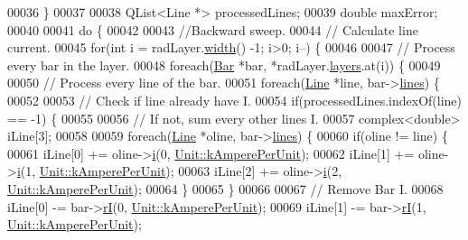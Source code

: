 \begin{DoxyCode}
00036   \}
00037 
00038   QList<Line *> processedLines;
00039   \textcolor{keywordtype}{double} maxError;
00040 
00041   \textcolor{keywordflow}{do} \{
00042 
00043     \textcolor{comment}{//Backward sweep.}
00044     \textcolor{comment}{// Calculate line current.}
00045     \textcolor{keywordflow}{for}(\textcolor{keywordtype}{int} i = radLayer.\hyperlink{class_radial_layer_ae8b32d0711cc6f4dbec832bb07d59a49}{width}() -1; i>0; i--) \{
00046 
00047       \textcolor{comment}{// Process every bar in the layer.}
00048       \textcolor{keywordflow}{foreach}(\hyperlink{class_bar}{Bar} *bar, *radLayer.\hyperlink{class_radial_layer_a714c36b1ab50a7778953e924ddac2787}{layers}.at(i)) \{
00049 
00050         \textcolor{comment}{// Process every line of the bar.}
00051         \textcolor{keywordflow}{foreach}(\hyperlink{class_line}{Line} *line, bar->\hyperlink{class_bar_a23b6d4319352ef0e77ad66aade4e0209}{lines}) \{
00052 
00053           \textcolor{comment}{// Check if line already have I.}
00054           \textcolor{keywordflow}{if}(processedLines.indexOf(line) == -1) \{
00055 
00056             \textcolor{comment}{// If not, sum every other lines I.}
00057             complex<double> iLine[3];
00058 
00059             \textcolor{keywordflow}{foreach}(\hyperlink{class_line}{Line} *oline, bar->\hyperlink{class_bar_a23b6d4319352ef0e77ad66aade4e0209}{lines}) \{
00060               \textcolor{keywordflow}{if}(oline != line) \{
00061                 iLine[0] += oline->\hyperlink{group___models_gaf81e7055102816465bdf7e19afc2d547}{i}(0, \hyperlink{class_unit_a0794cf6c9682f48296dd4a5315389787aeed3b50e464d581cb630181a3b6a0709}{Unit::kAmperePerUnit});
00062                 iLine[1] += oline->\hyperlink{group___models_gaf81e7055102816465bdf7e19afc2d547}{i}(1, \hyperlink{class_unit_a0794cf6c9682f48296dd4a5315389787aeed3b50e464d581cb630181a3b6a0709}{Unit::kAmperePerUnit});
00063                 iLine[2] += oline->\hyperlink{group___models_gaf81e7055102816465bdf7e19afc2d547}{i}(2, \hyperlink{class_unit_a0794cf6c9682f48296dd4a5315389787aeed3b50e464d581cb630181a3b6a0709}{Unit::kAmperePerUnit});
00064               \}
00065             \}
00066 
00067             \textcolor{comment}{// Remove Bar I.}
00068             iLine[0] -= bar->\hyperlink{group___models_ga8a009531f01430aa68eba739bb0dc2ea}{rI}(0, \hyperlink{class_unit_a0794cf6c9682f48296dd4a5315389787aeed3b50e464d581cb630181a3b6a0709}{Unit::kAmperePerUnit});
00069             iLine[1] -= bar->\hyperlink{group___models_ga8a009531f01430aa68eba739bb0dc2ea}{rI}(1, \hyperlink{class_unit_a0794cf6c9682f48296dd4a5315389787aeed3b50e464d581cb630181a3b6a0709}{Unit::kAmperePerUnit});

\end{DoxyCode}
